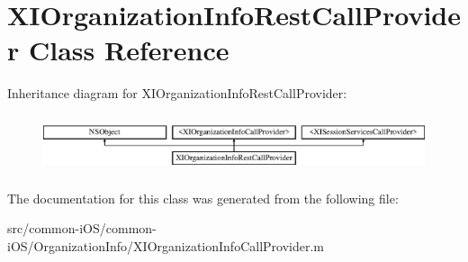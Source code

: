 \hypertarget{class_x_i_organization_info_rest_call_provider}{}\section{X\+I\+Organization\+Info\+Rest\+Call\+Provider Class Reference}
\label{class_x_i_organization_info_rest_call_provider}
Inheritance diagram for X\+I\+Organization\+Info\+Rest\+Call\+Provider\+:\begin{figure}[H]
\begin{center}
\leavevmode
\includegraphics[height=1.696970cm]{class_x_i_organization_info_rest_call_provider}
\end{center}
\end{figure}


The documentation for this class was generated from the following file\+:\begin{DoxyCompactItemize}
\item 
src/common-\/i\+O\+S/common-\/i\+O\+S/\+Organization\+Info/X\+I\+Organization\+Info\+Call\+Provider.\+m\end{DoxyCompactItemize}
